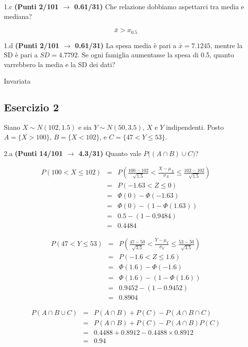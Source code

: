 \documentclass[
  11pt,
]{book}
\theoremstyle{mytheoremstyle}
\theoremstyle{mydefstyle}
\newenvironment{sol}
  {
  \begin{tcolorbox}[enhanced,breakable,arc=0.1mm,boxrule=1pt,colback=white,colframe=iblue,
  title=\bf \fontfamily{lmss}\selectfont \hspace{.5 cm} Soluzione,drop fuzzy shadow]

}{
\end{tcolorbox}
  }
\begin{document}
1.c \textbf{(Punti 2/101 \(\rightarrow\) 0.61/31)} Che relazione dobbiamo aspettarci tra media e mediana?

\begin{sol}
\[
\bar x > x_{0.5}
\]

\end{sol}

1.d \textbf{(Punti 2/101 \(\rightarrow\) 0.61/31)} La spesa media è pari a \(\bar x=7.1245\), mentre la SD è pari a \(SD=4.7792\).
Se ogni famiglia aumentasse la spesa di 0.5, quanto varrebbero la media e la SD dei dati?

\begin{sol}
Invariata

\end{sol}

\subsection{Esercizio 2}\label{esercizio-2-11}

Siano \(X\sim N(102,1.5)\) e sia \(Y\sim N(50,3.5)\), \(X\) e \(Y\) indipendenti. Posto \(A=\{X>100\}\), \(B=\{X<102\}\), e \(C=\{47<Y\le 53\}\).

2.a \textbf{(Punti 14/101 \(\rightarrow\) 4.3/31)} Quanto vale \(P\Big((A\cap B)\cup C\Big)\)?

\begin{sol}
\begin{eqnarray*}
   P( 100 < X \leq  102 ) &=& P\left( \frac { 100  -  102 }{\sqrt{ 1.5 }} < \frac { X  -  \mu_X }{ \sigma_X } \leq \frac { 102  -  102 }{\sqrt{ 1.5 }}\right)  \\
              &=& P\left(  -1.63  < Z \leq  0 \right) \\
              &=& \Phi( 0 )-\Phi( -1.63 )\\
              &=&  \Phi( 0 )-(1-\Phi( 1.63 )) \\ &=&  0.5 -(1- 0.9484 ) \\ 
              &=&  0.4484 
   \end{eqnarray*}

\begin{eqnarray*}
   P( 47 < Y \leq  53 ) &=& P\left( \frac { 47  -  50 }{\sqrt{ 3.5 }} < \frac { Y  -  \mu_Y }{ \sigma_Y } \leq \frac { 53  -  50 }{\sqrt{ 3.5 }}\right)  \\
              &=& P\left(  -1.6  < Z \leq  1.6 \right) \\
              &=& \Phi( 1.6 )-\Phi( -1.6 )\\
              &=&  \Phi( 1.6 )-(1-\Phi( 1.6 )) \\ &=&  0.9452 -(1- 0.9452 ) \\ 
              &=&  0.8904 
   \end{eqnarray*}

\begin{eqnarray*}
  P(A\cap B\cup C) &=&  P(A\cap B)+P(C)-P(A\cap B\cap C)\\
  &=& P(A\cap B)+P(C)-P(A\cap B)P(C)\\
  &=& 0.4488+0.8912-0.4488\times0.8912\\
  &=& 0.94
\end{eqnarray*}

\end{sol}
\end{document}
